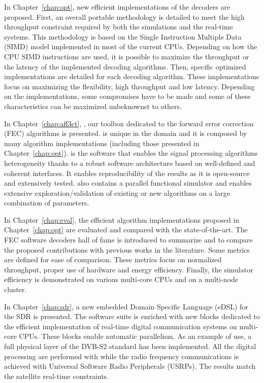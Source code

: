 In Chapter~\ref{chap:opt}, new efficient implementations of the decoders are
proposed. First, an overall portable methodology is detailed to meet the high
throughput constraint required by both the simulations and the real-time
systems. This methodology is based on the Single Instruction Multiple Data
(SIMD) model implemented in most of the current CPUs. Depending on how the CPU
SIMD instructions are used, it is possible to maximize the throughput or the
latency of the implemented decoding algorithms. Then, specific optimized
implementations are detailed for each decoding algorithm. These implementations
focus on maximizing the flexibility, high throughput and low latency. Depending
on the implementations, some compromises have to be made and some of these
characteristics can be maximized unbeknownst to others.

In Chapter~\ref{chap:aff3ct}, \AFFECT, our toolbox dedicated to the forward
error correction (FEC) algorithms is presented. \AFFECT is unique in the domain
and it is composed by many algorithm implementations (including those presented
in Chapter~\ref{chap:opt}). \AFFECT is the software that enables the signal
processing algorithms heterogeneity thanks to a robust software architecture
based on well-defined and coherent interfaces. It enables reproducibility of the
results as it is open-source and extensively tested. \AFFECT also contains a
parallel functional simulator and enables extensive exploration/validation of
existing or new algorithms on a large combination of parameters.

\newpage
In Chapter~\ref{chap:eval}, the efficient algorithm implementations proposed
in Chapter~\ref{chap:opt} are evaluated and compared with the state-of-the-art.
The FEC software decoders hall of fame is introduced to summarize and to compare
the proposed contributions with previous works in the literature. Some metrics
are defined for ease of comparison. These metrics focus on normalized
throughput, proper use of hardware and energy efficiency. Finally, the \AFFECT
simulator efficiency is demonstrated on various multi-core CPUs and on a
multi-node cluster.

In Chapter~\ref{chap:sdr}, a new embedded Domain Specific Language (eDSL) for
the SDR is presented. The \AFFECT software suite is enriched with new blocks
dedicated to the efficient implementation of real-time digital communication
systems on multi-core CPUs. These blocks enable automatic parallelism. As an
example of use, a full physical layer of the DVB-S2 standard has been
implemented. All the digital processing are performed with \AFFECT while the
radio frequency communications is achieved with Universal Software Radio
Peripherals (USRPs). The results match the satellite real-time constraints.
